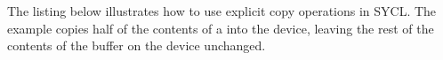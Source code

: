\completeTable

The listing below illustrates how to use explicit copy
operations in SYCL. The example copies half of the contents of
a  into the device, leaving the rest of the
contents of the buffer on the device unchanged.




